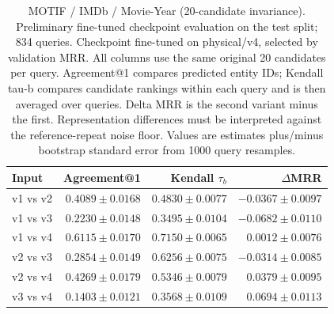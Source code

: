 \begin{table}[t]
\centering
\small
\begin{tabular}{lrrr}
\toprule
Input & Agreement@1 & Kendall $\tau_b$ & $\Delta$MRR \\
\midrule
v1 vs v2 & $0.4089 \pm 0.0168$ & $0.4830 \pm 0.0077$ & $-0.0367 \pm 0.0097$ \\
v1 vs v3 & $0.2230 \pm 0.0148$ & $0.3495 \pm 0.0104$ & $-0.0682 \pm 0.0110$ \\
v1 vs v4 & $0.6115 \pm 0.0170$ & $0.7150 \pm 0.0065$ & $0.0012 \pm 0.0076$ \\
v2 vs v3 & $0.2854 \pm 0.0149$ & $0.6256 \pm 0.0075$ & $-0.0314 \pm 0.0085$ \\
v2 vs v4 & $0.4269 \pm 0.0179$ & $0.5346 \pm 0.0079$ & $0.0379 \pm 0.0095$ \\
v3 vs v4 & $0.1403 \pm 0.0121$ & $0.3568 \pm 0.0109$ & $0.0694 \pm 0.0113$ \\
\bottomrule
\end{tabular}
\caption{MOTIF / IMDb / Movie-Year (20-candidate invariance). Preliminary fine-tuned checkpoint evaluation on the test split; 834 queries. Checkpoint fine-tuned on physical/v4, selected by validation MRR. All columns use the same original 20 candidates per query. Agreement@1 compares predicted entity IDs; Kendall tau-b compares candidate rankings within each query and is then averaged over queries. Delta MRR is the second variant minus the first. Representation differences must be interpreted against the reference-repeat noise floor. Values are estimates plus/minus bootstrap standard error from 1000 query resamples.}
\label{tab:motif-movie_year-invariance}
\end{table}
